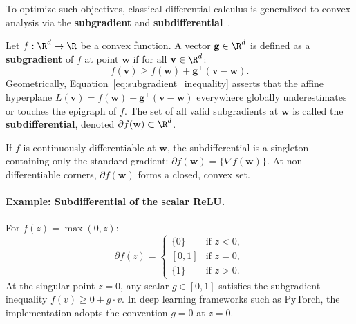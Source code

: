 To optimize such objectives, classical differential calculus is generalized to convex analysis via the \textbf{subgradient} and \textbf{subdifferential}~\cite{bishop2024deep,goodfellow2016deep}.

\begin{definition}
Let $f: \R^d \to \R$ be a convex function. A vector $\mathbf{g} \in \R^d$ is defined as a \textbf{subgradient} of $f$ at point $\mathbf{w}$ if for all $\mathbf{v} \in \R^d$:
\begin{equation}
f(\mathbf{v}) \ge f(\mathbf{w}) + \mathbf{g}^\top (\mathbf{v} - \mathbf{w}).
\label{eq:subgradient_inequality}
\end{equation}
Geometrically, Equation~\eqref{eq:subgradient_inequality} asserts that the affine hyperplane $L(\mathbf{v}) = f(\mathbf{w}) + \mathbf{g}^\top (\mathbf{v} - \mathbf{w})$ everywhere globally underestimates or touches the epigraph of $f$. The set of all valid subgradients at $\mathbf{w}$ is called the \textbf{subdifferential}, denoted $\partial f(\mathbf{w}) \subset \R^d$.
\end{definition}

If $f$ is continuously differentiable at $\mathbf{w}$, the subdifferential is a singleton containing only the standard gradient: $\partial f(\mathbf{w}) = \{\nabla f(\mathbf{w})\}$. At non-differentiable corners, $\partial f(\mathbf{w})$ forms a closed, convex set.

\paragraph{Example: Subdifferential of the scalar ReLU.}
For $f(z) = \max(0, z)$:
\begin{equation}
\partial f(z) = \begin{cases}
\{0\} & \text{if } z < 0, \\
[0, 1] & \text{if } z = 0, \\
\{1\} & \text{if } z > 0.
\end{cases}
\label{eq:relu_subdiff}
\end{equation}
At the singular point $z = 0$, any scalar $g \in [0, 1]$ satisfies the subgradient inequality $f(v) \ge 0 + g \cdot v$. In deep learning frameworks such as PyTorch, the implementation adopts the convention $g = 0$ at $z = 0$.

